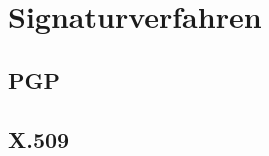
\chapter{Signaturverfahren}
\label{chp:Signaturverfahren}

\section{PGP}
%
\label{sec:Signaturverfahren:pgp}%

\section{X.509}
%
\label{sec:Signaturverfahren:x509}%

